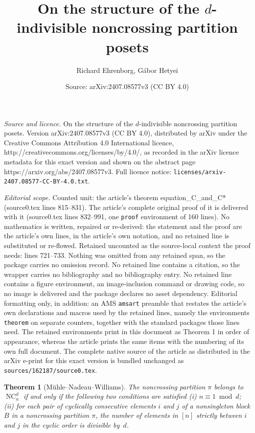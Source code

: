 \documentclass[10pt,a4paper]{amsart}
\title{On the structure of the $d$-indivisible noncrossing partition posets}
\author{Richard Ehrenborg, G\'abor Hetyei}
\date{Source: arXiv:2407.08577v3 (CC BY 4.0)}
\newtheorem{theorem}{Theorem}
\DeclareMathOperator{\NC}{NC}
\begin{document}
\maketitle

\noindent\emph{Source and licence.} On the structure of the $d$-indivisible noncrossing partition posets. Version arXiv:2407.08577v3 (CC BY 4.0), distributed by arXiv under the Creative Commons Attribution 4.0 International licence, http://creativecommons.org/licenses/by/4.0/, as recorded in the arXiv licence metadata for this exact version and shown on the abstract page https://arxiv.org/abs/2407.08577v3. Full licence notice: \texttt{licenses/arxiv-2407.08577-CC-BY-4.0.txt}.\par\smallskip

\noindent\textit{Editorial scope.} Counted unit: the article's theorem equation\_C\_and\_C* (source0.tex lines 815--831). The article's complete original proof of it is delivered with it (source0.tex lines 832--991, one \texttt{proof} environment of 160 lines). No mathematics is written, repaired or re-derived: the statement and the proof are the article's own lines, in the article's own notation, and no retained line is substituted or re-flowed.  Retained uncounted as the source-local context the proof needs: lines 721--733.  Nothing was omitted from any retained span, so the package carries no omission record.  No retained line contains a citation, so the wrapper carries no bibliography and no bibliography entry.  No retained line contains a figure environment, an image-inclusion command or drawing code, so no image is delivered and the package declares no asset dependency.  Editorial formatting only, in addition: an AMS \texttt{amsart} preamble that restates the article's own declarations and macros used by the retained lines, namely the environments \texttt{theorem} on separate counters, together with the standard packages those lines need.  The retained environments print in this document as Theorem 1 in order of appearance, whereas the article prints the same items with the numbering of its own full document.  The complete native source of the article as distributed in the arXiv e-print for this exact version is bundled unchanged as \texttt{sources/162187/source0.tex}.
\begin{theorem}[M\"uhle--Nadeau--Williams]
\label{theorem_characterization}
The noncrossing partition $\pi$ belongs to $\NC^{d}_{n}$
if and only if
the following two conditions are satisfied
(i)
$n \equiv 1 \bmod d$;
(ii)
for each pair of cyclically consecutive elements $i$ and $j$
of a nonsingleton block $B$ in a noncrossing partition $\pi$,
the number of elements in $[n]$ strictly between $i$ and $j$ in the cyclic order
is divisible by~$d$.
\end{theorem}
\end{document}
